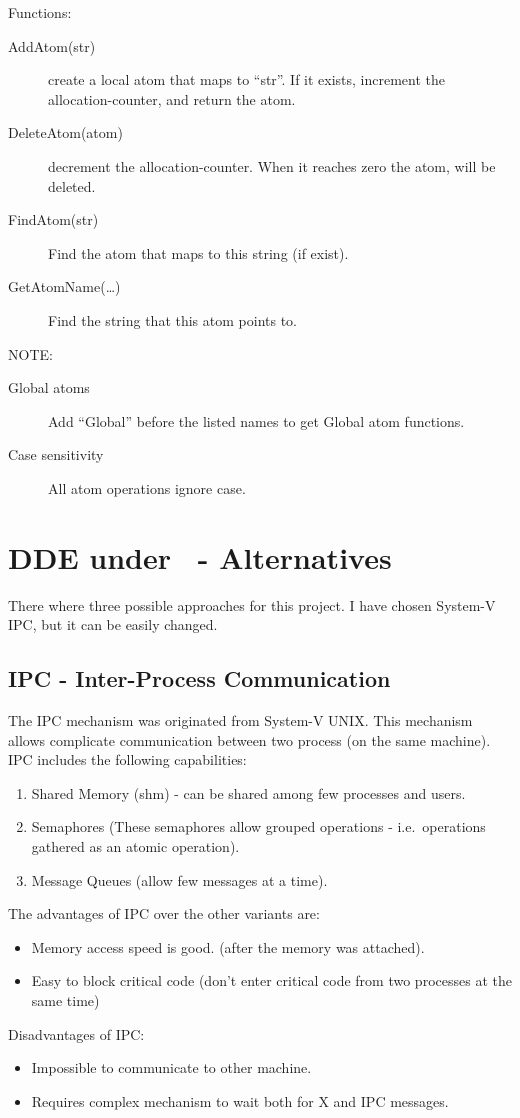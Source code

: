 Functions:
\begin{description}
  \item[AddAtom(str)]   create a local atom that maps to ``str''.
    If it exists, increment the allocation-counter,
    and return the atom.
  \item[DeleteAtom(atom)] decrement the allocation-counter.  When it
    reaches zero the atom, will be deleted.
  \item[FindAtom(str)]  Find the atom that maps to this string (if exist).
    
  \item[GetAtomName(\ldots)] Find the string that this atom points to.
\end{description}

NOTE:
\begin{description}
  \item[Global atoms] Add ``Global'' before the listed names to get Global
    atom functions.
  \item[Case sensitivity] All atom operations ignore case.
\end{description}


\section{DDE under \Wine\ - Alternatives}
\label{DDE-Alternatives}
There where three possible approaches for this project. I have chosen
System-V IPC, but it can be easily changed.

\subsection{IPC - Inter-Process Communication}
\label{sec:SysV-IPC}

The IPC mechanism was originated from System-V UNIX\@. This mechanism
allows complicate communication between two process (on the same machine). 
IPC includes the following capabilities:
\begin{enumerate}
  \item Shared Memory (shm) - can be shared among few processes and users.
  \item Semaphores (These semaphores allow grouped operations - i.e.\ 
    operations gathered as an atomic operation).
  \item Message Queues (allow few messages at a time).
\end{enumerate}

The advantages of IPC over the other variants are:
\begin{itemize}
  \item Memory access speed is good. (after the memory was attached).
  \item Easy to block critical code (don't enter critical code from two
    processes at the same time)
\end{itemize}
Disadvantages of IPC:
\begin{itemize}
  \item Impossible to communicate to other machine.
  \item Requires complex mechanism to wait both for X and IPC messages.
\end{itemize}

